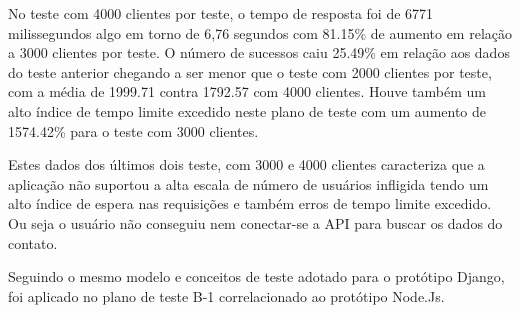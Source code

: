   No teste com 4000 clientes por teste, o tempo de resposta foi de 6771 milissegundos algo em torno de 6,76 segundos com  81.15\% de aumento
  em relação a 3000 clientes por teste. O número de sucessos caiu 25.49\% em relação aos dados do teste anterior chegando a ser menor que o
  teste com 2000 clientes por teste, com a média de 1999.71 contra 1792.57 com 4000 clientes. Houve também um alto índice de tempo limite excedido
  neste plano de teste com um aumento de 1574.42\% para o teste com 3000 clientes.

  Estes dados dos últimos dois teste, com 3000 e 4000 clientes caracteriza que a aplicação não suportou a alta escala de número de usuários infligida
  tendo um alto índice de espera nas requisições e também erros de tempo limite excedido. Ou seja o usuário não conseguiu nem conectar-se
  a API para buscar os dados do contato.

  Seguindo o mesmo modelo e conceitos de teste adotado para o protótipo Django, foi aplicado no plano de teste
  B-1 correlacionado ao protótipo Node.Js.

